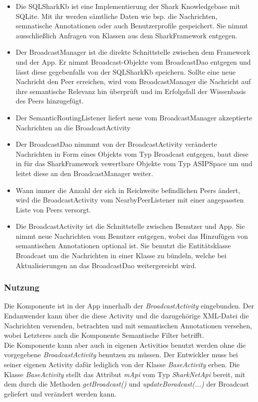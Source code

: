 \begin{itemize}
	\item Die SQLSharkKb ist eine Implementierung der Shark Knowledgebase mit SQLite. Mit ihr werden sämtliche Daten wie bsp. die Nachrichten, semnatische Annotationen oder auch Benutzerprofile gespeichert. Sie nimmt ausschließlich Anfragen von Klassen aus dem SharkFramework entgegen.
	\item Der BroadcastManager ist die direkte Schnittstelle zwischen dem Framework und der App. Er nimmt Broadcast-Objekte vom BroadcastDao entgegen und lässt diese gegebenfalls von der SQLSharkKb speichern. Sollte eine neue Nachricht den Peer erreichen, wird vom BroadcastManager die Nachricht auf ihre semantische Relevanz hin überprüft und im Erfolgsfall der Wissenbasis des Peers hinzugefügt.
	\item Der SemanticRoutingListener liefert neue vom BroadcastManager akzeptierte Nachrichten an die BroadcastActivity
	\item Der BroadcastDao nimmmt von der BroadcastActivity veränderte Nachrichten in Form eines Objekts vom Typ Broadcast entgegen, baut diese in für das SharkFramework vewertbare Objekte vom Typ ASIPSpace um und leitet diese an den BroadcastManager weiter.
	\item Wann immer die Anzahl der sich in Reichweite befindlichen Peers ändert, wird die BroadcastActivity vom NearbyPeerListener mit einer angepassten Liste von Peers versorgt.
	\item Die BroadcastActivity ist die Schnittstelle zwischen Benutzer und App. Sie nimmt neue Nachrichten vom Benutzer entgegen, wobei das Hinzufügen von semantischen Annotationen optional ist. Sie benutzt die Entitätsklasse Broadcast um die Nachrichten in einer Klasse zu bündeln, welche bei Aktualisierungen an das BroadcastDao weitergereicht wird. 
\end{itemize}

\label{ch:broadcastinterfaces}


\subsubsection{Nutzung}
Die Komponente ist in der App innerhalb der \textit{BroadcastActivity} eingebunden. Der Endanwender kann über die diese Activity und die dazugehörige XML-Datei die Nachrichten versenden, betrachten und mit semantischen Annotationen versehen, wobei Letzteres auch die Komponente Semantische Filter betrifft.
\\Die Komponente kann aber auch in eigenen Activities benutzt werden ohne die vorgegebene \textit{BroadcastActivity} benutzen zu müssen. Der Entwickler muss bei seiner eigenen Activity dafür lediglich von der Klasse \textit{BaseActivity} erben. Die Klasse \textit{BaseActivity} stellt das Attribut \textit{mApi} vom Typ \textit{SharkNetApi} bereit, mit dem durch die Methoden \textit{getBroadcast()} und \textit{updateBoradcast(...)} der Broadcast geliefert und verändert werden kann.
\\

